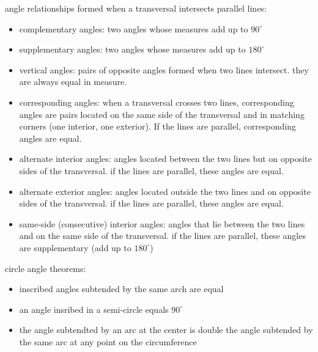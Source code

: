 \documentclass{article}
\begin{document}
angle relationships formed when a transversal intersects parallel lines:
	\begin{itemize}
		\item complementary angles: two angles whose measures add up to $90^{\circ}$
		\item supplementary angles: two angles whose measures add up to $180^{\circ}$
		\item vertical angles: pairs of opposite angles formed when two lines intersect. they are always equal in measure.
		\item corresponding angles: when a transversal crosses two lines, corresponding angles are pairs located on the same side of the transversal and in matching corners (one interior, one exterior). If the lines are parallel, corresponding angles are equal.
		\item alternate interior angles: angles located between the two lines but on opposite sides of the transversal. if the lines are parallel, these angles are equal.
		\item alternate exterior angles: angles located outside the two lines and on opposite sides of the transversal. if the lines are parallel, these angles are equal.
		\item same-side (consecutive) interior angles: angles that lie between the two lines and on the same side of the transversal. if the lines are parallel, these angles are supplementary (add up to $180^{\circ}$)
	\end{itemize}

circle angle theorems:
	\begin{itemize}
		\item inscribed angles subtended by the same arch are equal
		\item an angle insribed in a semi-circle equals $90^{\circ}$
		\item the angle subtendted by an arc at the center is double the angle subtended by the same arc at any point on the circumference
	\end{itemize}


\begin{center}
\end{center}
\end{document}
